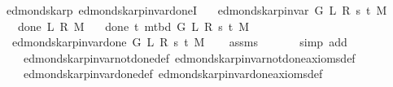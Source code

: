 \begin{isabellebody}
\isamarkupfalse%
\ {\isacharparenleft}{\kern0pt}\ edmonds{\isacharunderscore}{\kern0pt}karp{\isacharparenright}{\kern0pt}\ edmonds{\isacharunderscore}{\kern0pt}karp{\isacharunderscore}{\kern0pt}invar{\isacharunderscore}{\kern0pt}done{\isacharunderscore}{\kern0pt}{}I{\isacharunderscore}{\kern0pt}{}{\isacharcolon}{\kern0pt}\isanewline
\ \ \ {\isachardoublequoteopen}edmonds{\isacharunderscore}{\kern0pt}karp{\isacharunderscore}{\kern0pt}invar{\isacharprime}{\kern0pt}\ G\ L\ R\ s\ t\ M{\isachardoublequoteclose}\isanewline
\ \ \ {\isachardoublequoteopen}{\isasymnot}\ done{\isacharunderscore}{\kern0pt}{}\ L\ R\ M{\isachardoublequoteclose}\isanewline
\ \ \ {\isachardoublequoteopen}done{\isacharunderscore}{\kern0pt}{}\ t\ {\isacharparenleft}{\kern0pt}m{\isacharunderscore}{\kern0pt}tbd\ G\ L\ R\ s\ t\ M{\isacharparenright}{\kern0pt}{\isachardoublequoteclose}\isanewline
\ \ \ {\isachardoublequoteopen}edmonds{\isacharunderscore}{\kern0pt}karp{\isacharunderscore}{\kern0pt}invar{\isacharunderscore}{\kern0pt}done{\isacharunderscore}{\kern0pt}{}{\isacharprime}{\kern0pt}\ G\ L\ R\ s\ t\ M{\isachardoublequoteclose}%
\endisataginvisible
{\isafoldinvisible}%
%
\isadeliminvisible
\isanewline
%
\endisadeliminvisible
%
\isadelimproof
\ \ %
\endisadelimproof
%
\isatagproof
{}\isamarkupfalse%
\ assms\isanewline
\ \ \isamarkupfalse%
\isanewline
\ \ \ \ {\isacharparenleft}{\kern0pt}simp\ add{\isacharcolon}{\kern0pt}\isanewline
\ \ \ \ \ edmonds{\isacharunderscore}{\kern0pt}karp{\isacharunderscore}{\kern0pt}invar{\isacharunderscore}{\kern0pt}not{\isacharunderscore}{\kern0pt}done{\isacharunderscore}{\kern0pt}{}{\isacharunderscore}{\kern0pt}def\ edmonds{\isacharunderscore}{\kern0pt}karp{\isacharunderscore}{\kern0pt}invar{\isacharunderscore}{\kern0pt}not{\isacharunderscore}{\kern0pt}done{\isacharunderscore}{\kern0pt}{}{\isacharunderscore}{\kern0pt}axioms{\isacharunderscore}{\kern0pt}def\isanewline
\ \ \ \ \ edmonds{\isacharunderscore}{\kern0pt}karp{\isacharunderscore}{\kern0pt}invar{\isacharunderscore}{\kern0pt}done{\isacharunderscore}{\kern0pt}{}{\isacharunderscore}{\kern0pt}def\ edmonds{\isacharunderscore}{\kern0pt}karp{\isacharunderscore}{\kern0pt}invar{\isacharunderscore}{\kern0pt}done{\isacharunderscore}{\kern0pt}{}{\isacharunderscore}{\kern0pt}axioms{\isacharunderscore}{\kern0pt}def{\isacharparenright}{\kern0pt}%
\endisatagproof
{\isafoldproof}%

\end{isabellebody}
